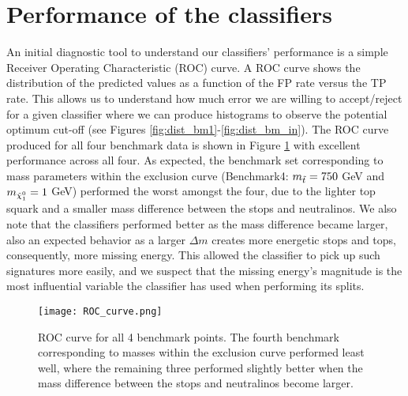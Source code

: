
\section{Performance of the classifiers}
An initial diagnostic tool to understand our classifiers' performance is a simple Receiver Operating Characteristic (ROC) curve. A ROC curve shows the distribution of the predicted values as a function of the FP rate versus the TP rate. This allows us to understand how much error we are willing to accept/reject for a given classifier where we can produce histograms to observe the potential optimum cut-off (see Figures \ref{fig:dist_bm1}-\ref{fig:dist_bm_in}). The ROC curve produced for all four benchmark data is shown in Figure \ref{fig:ROC} with excellent performance across all four. As expected, the benchmark set corresponding to mass parameters within the exclusion curve (Benchmark4: $m_{\Tilde{t}} = 750$ GeV and $m_{\Tilde{\chi}_1^0} = 1$ GeV) performed the worst amongst the four, due to the lighter top squark and a smaller mass difference between the stops and neutralinos. We also note that the classifiers performed better as the mass difference became larger, also an expected behavior as a larger $\Delta m$ creates more energetic stops and tops, consequently, more missing energy. This allowed the classifier to pick up such signatures more easily, and we suspect that the missing energy's magnitude is the most influential variable the classifier has used when performing its splits. \\

\begin{figure}[htbp]
    \centering
    \texttt{[image: ROC\_curve.png]}
    \caption{ROC curve for all 4 benchmark points. The fourth benchmark corresponding to masses within the exclusion curve performed least well, where the remaining three performed slightly better when the mass difference between the stops and neutralinos become larger.}
    \label{fig:ROC}
\end{figure} 

